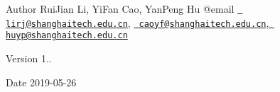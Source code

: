 \begin{DoxyAuthor}{Author}
Rui\+Jian Li, Yi\+Fan Cao, Yan\+Peng Hu @email \href{mailto:lirj@shanghaitech.edu.cn}{\texttt{ lirj@shanghaitech.\+edu.\+cn}}, \href{mailto:caoyf@shanghaitech.edu.cn}{\texttt{ caoyf@shanghaitech.\+edu.\+cn}},\href{mailto:huyp@shanghaitech.edu.cn}{\texttt{ huyp@shanghaitech.\+edu.\+cn}} 
\end{DoxyAuthor}
\begin{DoxyVersion}{Version}
1.. 
\end{DoxyVersion}
\begin{DoxyDate}{Date}
2019-\/05-\/26 
\end{DoxyDate}

